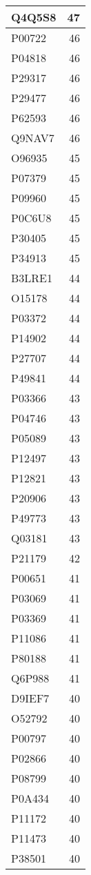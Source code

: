\documentclass[
]{book}
\theoremstyle{definition}
\theoremstyle{definition}
\theoremstyle{definition}
\theoremstyle{definition}
\theoremstyle{remark}
\begin{document}
\begin{table}
\begin{tabular}{l|r}
\hline
Q4Q5S8 & 47\\
\hline
P00722 & 46\\
\hline
P04818 & 46\\
\hline
P29317 & 46\\
\hline
P29477 & 46\\
\hline
P62593 & 46\\
\hline
Q9NAV7 & 46\\
\hline
O96935 & 45\\
\hline
P07379 & 45\\
\hline
P09960 & 45\\
\hline
P0C6U8 & 45\\
\hline
P30405 & 45\\
\hline
P34913 & 45\\
\hline
B3LRE1 & 44\\
\hline
O15178 & 44\\
\hline
P03372 & 44\\
\hline
P14902 & 44\\
\hline
P27707 & 44\\
\hline
P49841 & 44\\
\hline
P03366 & 43\\
\hline
P04746 & 43\\
\hline
P05089 & 43\\
\hline
P12497 & 43\\
\hline
P12821 & 43\\
\hline
P20906 & 43\\
\hline
P49773 & 43\\
\hline
Q03181 & 43\\
\hline
P21179 & 42\\
\hline
P00651 & 41\\
\hline
P03069 & 41\\
\hline
P03369 & 41\\
\hline
P11086 & 41\\
\hline
P80188 & 41\\
\hline
Q6P988 & 41\\
\hline
D9IEF7 & 40\\
\hline
O52792 & 40\\
\hline
P00797 & 40\\
\hline
P02866 & 40\\
\hline
P08799 & 40\\
\hline
P0A434 & 40\\
\hline
P11172 & 40\\
\hline
P11473 & 40\\
\hline
P38501 & 40\\

\end{tabular}
\end{table}
\end{document}
